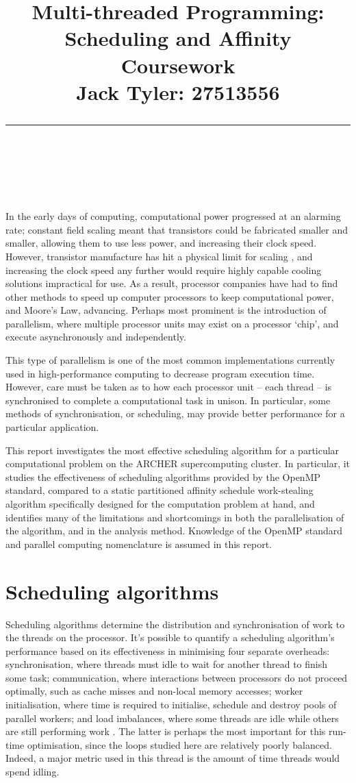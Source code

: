 \documentclass{article} %
\title{\raggedright
\normalfont \normalsize 
\huge Multi-threaded Programming: Scheduling and Affinity Coursework \\[1em]
\normalsize \normalfont Jack Tyler: 27513556 \\
\rule{\linewidth}{.5pt}  \\[6pt]
}
\begin{document}
\maketitle

In the early days of computing, computational power progressed at an alarming rate; constant field scaling meant that transistors could be fabricated smaller and smaller, allowing them to use less power, and increasing their clock speed.
However, transistor manufacture has hit a physical limit for scaling \citep{Mcfarland1995}, and increasing the clock speed any further would require highly capable cooling solutions impractical for use.
As a result, processor companies have had to find other methods to speed up computer processors to keep computational power, and Moore's Law, advancing.
Perhaps most prominent is the introduction of parallelism, where multiple processor units may exist on a processor `chip', and execute asynchronously and independently.

This type of parallelism is one of the most common implementations currently used in high-performance computing to decrease program execution time.
However, care must be taken as to how each processor unit -- each thread -- is synchronised to complete a computational task in unison. In particular,
some methods of synchronisation, or scheduling, may provide better performance for a particular application.

This report investigates the most effective scheduling algorithm for a particular computational problem on the ARCHER supercomputing cluster.
In particular, it studies the effectiveness of scheduling algorithms provided by the OpenMP standard, compared to a static partitioned affinity schedule work-stealing algorithm specifically designed for the computation problem at hand, and identifies many of the limitations and shortcomings in both the parallelisation of the algorithm, and in the analysis method. Knowledge of the OpenMP standard and parallel computing nomenclature is assumed in this report.

\section*{Scheduling algorithms}

Scheduling algorithms determine the distribution and synchronisation of work to the threads on the processor.
It's possible to quantify a scheduling algorithm's performance based on its effectiveness in minimising four separate overheads:
synchronisation, where threads must idle to wait for another thread to finish some task;
communication, where interactions between processors do not proceed optimally, such as cache misses and non-local memory accesses;
worker initialisation, where time is required to initialise, schedule and destroy pools of parallel workers;
and load imbalances, where some threads are idle while others are still performing work \citep{1701915}.
The latter is perhaps the most important for this run-time optimisation, since the loops studied here are relatively poorly balanced.
Indeed, a major metric used in this thread is the amount of time threads would spend idling.
\end{document}
